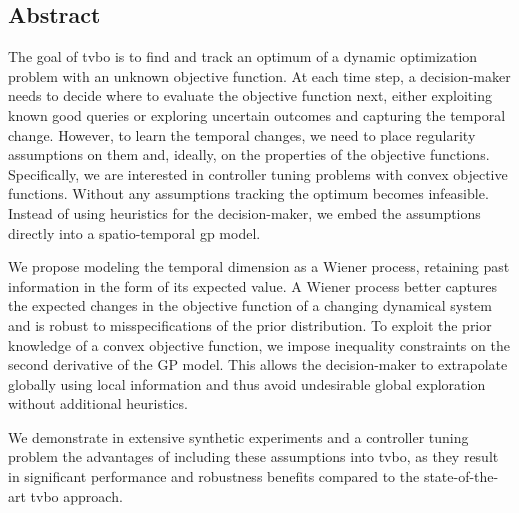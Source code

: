 \subsection*{Abstract}


The goal of \gls{tvbo} is to find and track an optimum of a dynamic optimization problem with an unknown objective function. At each time step, a decision-maker needs to decide where to evaluate the objective function next, either exploiting known good queries or exploring uncertain outcomes and capturing the temporal change. However, to learn the temporal changes, we need to place regularity assumptions on them and, ideally, on the properties of the objective functions. Specifically, we are interested in controller tuning problems with convex objective functions. Without any assumptions tracking the optimum becomes infeasible. Instead of using heuristics for the decision-maker, we embed the assumptions directly into a spatio-temporal \gls{gp} model.

We propose modeling the temporal dimension as a Wiener process, retaining past information in the form of its expected value. A Wiener process better captures the expected changes in the objective function of a changing dynamical system and is robust to misspecifications of the prior distribution. To exploit the prior knowledge of a convex objective function, we impose inequality constraints on the second derivative of the GP model. This allows the decision-maker to extrapolate globally using local information and thus avoid undesirable global exploration without additional heuristics.

We demonstrate in extensive synthetic experiments and a controller tuning problem the advantages of including these assumptions into \gls{tvbo}, as they result in significant performance and robustness benefits compared to the state-of-the-art \gls{tvbo} approach. 
 


